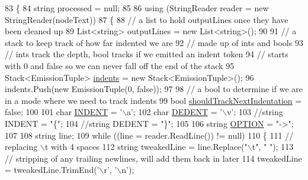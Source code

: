 \begin{DoxyCode}
83         \{
84             \textcolor{keywordtype}{string} processed = null;
85 
86             \textcolor{keyword}{using} (StringReader reader = \textcolor{keyword}{new} StringReader(nodeText))
87             \{
88                 \textcolor{comment}{// a list to hold outputLines once they have been cleaned up}
89                 List<string> outputLines = \textcolor{keyword}{new} List<string>();
90 
91                 \textcolor{comment}{// a stack to keep track of how far indented we are}
92                 \textcolor{comment}{// made up of ints and bools}
93                 \textcolor{comment}{// ints track the depth, bool tracks if we emitted an indent token}
94                 \textcolor{comment}{// starts with 0 and false so we can never fall off the end of the stack}
95                 Stack<EmissionTuple> \hyperlink{a00321_a00fba9ee9674b2513dbe28eab795b734}{indents} = \textcolor{keyword}{new} Stack<EmissionTuple>();
96                 indents.Push(\textcolor{keyword}{new} EmissionTuple(0, \textcolor{keyword}{false}));
97 
98                 \textcolor{comment}{// a bool to determine if we are in a mode where we need to track indents}
99                 \textcolor{keywordtype}{bool} \hyperlink{a00321_afa485f45ab87bc0f06c1dfc46737c057}{shouldTrackNextIndentation} = \textcolor{keyword}{false};
100 
101                 \textcolor{keywordtype}{char} \hyperlink{a00321_ae3f2190a793ab77428838e58e0e83676}{INDENT} = \textcolor{charliteral}{'\(\backslash\)a'};
102                 \textcolor{keywordtype}{char} \hyperlink{a00321_a83653c3e52fa74614e655a91ad2b7181}{DEDENT} = \textcolor{charliteral}{'\(\backslash\)v'};
103                 \textcolor{comment}{//string INDENT = "\{";}
104                 \textcolor{comment}{//string DEDENT = "\}";}
105 
106                 \textcolor{keywordtype}{string} \hyperlink{a00321_a7ca2dc5371587b21476669a45af013cd}{OPTION} = \textcolor{stringliteral}{"->"};
107 
108                 \textcolor{keywordtype}{string} line;
109                 \textcolor{keywordflow}{while} ((line = reader.ReadLine()) != null)
110                 \{
111                     \textcolor{comment}{// replacing \(\backslash\)t with 4 spaces}
112                     \textcolor{keywordtype}{string} tweakedLine = line.Replace(\textcolor{stringliteral}{"\(\backslash\)t"}, \textcolor{stringliteral}{"    "});
113                     \textcolor{comment}{// stripping of any trailing newlines, will add them back in later}
114                     tweakedLine = tweakedLine.TrimEnd(\textcolor{charliteral}{'\(\backslash\)r'}, \textcolor{charliteral}{'\(\backslash\)n'});

\end{DoxyCode}
